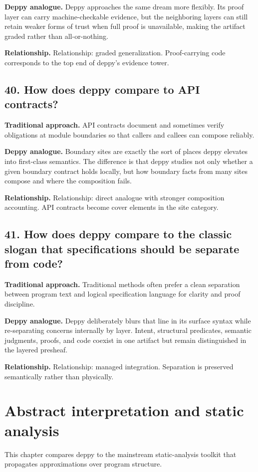 \documentclass[11pt,openany]{book}
\begin{document}
\textbf{Deppy analogue.} Deppy approaches the same dream more flexibly. Its proof layer can carry machine-checkable evidence, but the neighboring layers can still retain weaker forms of trust when full proof is unavailable, making the artifact graded rather than all-or-nothing.

\textbf{Relationship.} Relationship: graded generalization. Proof-carrying code corresponds to the top end of deppy's evidence tower.

\section*{40. How does deppy compare to API contracts?}
\textbf{Traditional approach.} API contracts document and sometimes verify obligations at module boundaries so that callers and callees can compose reliably.

\textbf{Deppy analogue.} Boundary sites are exactly the sort of places deppy elevates into first-class semantics. The difference is that deppy studies not only whether a given boundary contract holds locally, but how boundary facts from many sites compose and where the composition fails.

\textbf{Relationship.} Relationship: direct analogue with stronger composition accounting. API contracts become cover elements in the site category.

\section*{41. How does deppy compare to the classic slogan that specifications should be separate from code?}
\textbf{Traditional approach.} Traditional methods often prefer a clean separation between program text and logical specification language for clarity and proof discipline.

\textbf{Deppy analogue.} Deppy deliberately blurs that line in its surface syntax while re-separating concerns internally by layer. Intent, structural predicates, semantic judgments, proofs, and code coexist in one artifact but remain distinguished in the layered presheaf.

\textbf{Relationship.} Relationship: managed integration. Separation is preserved semantically rather than physically.

\chapter{Abstract interpretation and static analysis}
This chapter compares deppy to the mainstream static-analysis toolkit that propagates approximations over program structure.
\end{document}
